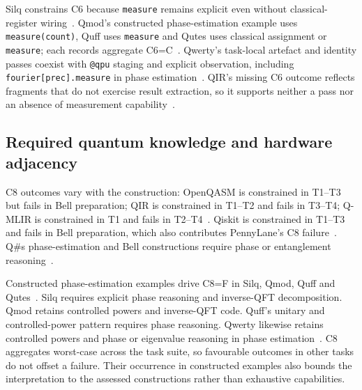 Silq constrains C6 because \texttt{measure} remains explicit even without classical-register wiring~\cite{bichsel2020silq,kavadias2026qplSurveySupplementary}.
Qmod's constructed phase-estimation example uses \texttt{measure(count)}, Quff uses \texttt{measure} and Qutes uses classical assignment or \texttt{measure}; each records aggregate C6=C~\cite{vax2025qmodexpressivehighlevelquantum,wright2024quff,faro2025qutes,kavadias2026qplSurveySupplementary}.
Qwerty's task-local artefact and identity passes coexist with \texttt{@qpu} staging and explicit observation, including \texttt{fourier[prec].measure} in phase estimation~\cite{adams2024qwerty,kavadias2026qplSurveySupplementary}.
QIR's missing C6 outcome reflects fragments that do not exercise result extraction, so it supports neither a pass nor an absence of measurement capability~\cite{qir_alliance_qir_spec_repo,kavadias2026qplSurveySupplementary}.

\subsection{Required quantum knowledge and hardware adjacency}\label{subsec:system_assessments:knowledge}
C8 outcomes vary with the construction: OpenQASM is constrained in T1--T3 but fails in Bell preparation; QIR is constrained in T1--T2 and fails in T3--T4; Q-MLIR is constrained in T1 and fails in T2--T4~\cite{cross2022openqasm3,qir_alliance_qir_spec_repo,McCaskey2021MLIRDialectQASM,kavadias2026qplSurveySupplementary}.
Qiskit is constrained in T1--T3 and fails in Bell preparation, which also contributes PennyLane's C8 failure~\cite{aleksandrowicz2019qiskit,bergholm2018pennylane,kavadias2026qplSurveySupplementary}.
Q\#s phase-estimation and Bell constructions require phase or entanglement reasoning~\cite{MicrosoftQSharpOverview,kavadias2026qplSurveySupplementary}.

Constructed phase-estimation examples drive C8=F in Silq, Qmod, Quff and Qutes~\cite{bichsel2020silq,vax2025qmodexpressivehighlevelquantum,wright2024quff,faro2025qutes,kavadias2026qplSurveySupplementary}.
Silq requires explicit phase reasoning and inverse-QFT decomposition.
Qmod retains controlled powers and inverse-QFT code.
Quff's unitary and controlled-power pattern requires phase reasoning.
Qwerty likewise retains controlled powers and phase or eigenvalue reasoning in phase estimation~\cite{adams2024qwerty,kavadias2026qplSurveySupplementary}.
C8 aggregates worst-case across the task suite, so favourable outcomes in other tasks do not offset a failure.
Their occurrence in constructed examples also bounds the interpretation to the assessed constructions rather than exhaustive capabilities.

